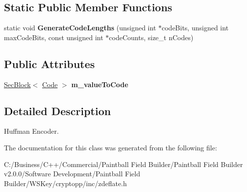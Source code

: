 \subsection*{Static Public Member Functions}
\begin{DoxyCompactItemize}
\item 
\hypertarget{class_huffman_encoder_a406b1895158502a793d1e607a2e9efb1}{
static void {\bfseries GenerateCodeLengths} (unsigned int $\ast$codeBits, unsigned int maxCodeBits, const unsigned int $\ast$codeCounts, size\_\-t nCodes)}
\label{class_huffman_encoder_a406b1895158502a793d1e607a2e9efb1}

\end{DoxyCompactItemize}
\subsection*{Public Attributes}
\begin{DoxyCompactItemize}
\item 
\hypertarget{class_huffman_encoder_a100511c8332005139f009b63f828d19e}{
\hyperlink{class_sec_block}{SecBlock}$<$ \hyperlink{struct_huffman_encoder_1_1_code}{Code} $>$ {\bfseries m\_\-valueToCode}}
\label{class_huffman_encoder_a100511c8332005139f009b63f828d19e}

\end{DoxyCompactItemize}


\subsection{Detailed Description}
Huffman Encoder. 

The documentation for this class was generated from the following file:\begin{DoxyCompactItemize}
\item 
C:/Business/C++/Commercial/Paintball Field Builder/Paintball Field Builder v2.0.0/Software Development/Paintball Field Builder/WSKey/cryptopp/inc/zdeflate.h\end{DoxyCompactItemize}

